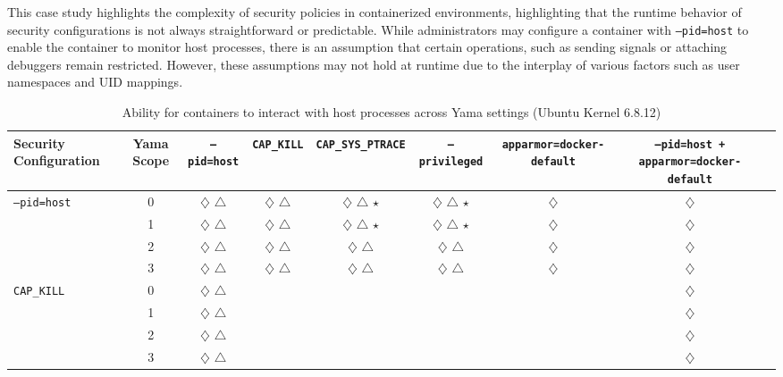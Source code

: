 \documentclass[12pt]{report}
\begin{document}
\begin{doublespace}
This case study highlights the complexity of security policies in containerized environments, highlighting that the runtime behavior of security configurations is not always straightforward or predictable. While administrators may configure a container with \texttt{--pid=host} to enable the container to monitor host processes, there is an assumption that certain operations, such as sending signals or attaching debuggers remain restricted. However, these assumptions may not hold at runtime due to the interplay of various factors such as user namespaces and UID mappings.


\begin{table}[!h]
    \centering
    \footnotesize
    \setlength{\tabcolsep}{4pt}
    \renewcommand{\arraystretch}{1.1}
    \caption{Ability for containers to interact with host processes across Yama settings (Ubuntu Kernel 6.8.12)}
    \label{tab:combined-pid-namespace-security}
    \begin{adjustbox}{max width=\textwidth}
    \begin{tabular}{|l|c|c|c|c|c|c|c|c|}
        \hline
        \textbf{Security Configuration} & \textbf{Yama Scope} & \texttt{--pid=host} & \texttt{CAP\_KILL} & \texttt{CAP\_SYS\_PTRACE} & \texttt{--privileged} & \texttt{apparmor=docker-default} & \texttt{--pid=host + apparmor=docker-default} \\
        \hline

        \multirow{4}{*}{\texttt{--pid=host}} 
            & 0 & $\diamondsuit$ $\triangle$ & $\diamondsuit$ $\triangle$ & $\diamondsuit$ $\triangle$ $\star$ & $\diamondsuit$ $\triangle$ $\star$ & $\diamondsuit$ & $\diamondsuit$ \\
            & 1 & $\diamondsuit$ $\triangle$ & $\diamondsuit$ $\triangle$ & $\diamondsuit$ $\triangle$ $\star$ & $\diamondsuit$ $\triangle$ $\star$ & $\diamondsuit$ & $\diamondsuit$ \\
            & 2 & $\diamondsuit$ $\triangle$ & $\diamondsuit$ $\triangle$ & $\diamondsuit$ $\triangle$ & $\diamondsuit$ $\triangle$ & $\diamondsuit$ & $\diamondsuit$ \\
            & 3 & $\diamondsuit$ $\triangle$ & $\diamondsuit$ $\triangle$ & $\diamondsuit$ $\triangle$ & $\diamondsuit$ $\triangle$ & $\diamondsuit$ & $\diamondsuit$ \\
        \hline

        \multirow{4}{*}{\texttt{CAP\_KILL}} 
            & 0 & $\diamondsuit$ $\triangle$ &  &  &  &  & $\diamondsuit$ \\
            & 1 & $\diamondsuit$ $\triangle$ &  &  &  &  & $\diamondsuit$ \\
            & 2 & $\diamondsuit$ $\triangle$ &  &  &  &  & $\diamondsuit$ \\
            & 3 & $\diamondsuit$ $\triangle$ &  &  &  &  & $\diamondsuit$ \\
        \hline


\end{tabular}
\end{adjustbox}
\end{table}
\end{doublespace}
\end{document}
